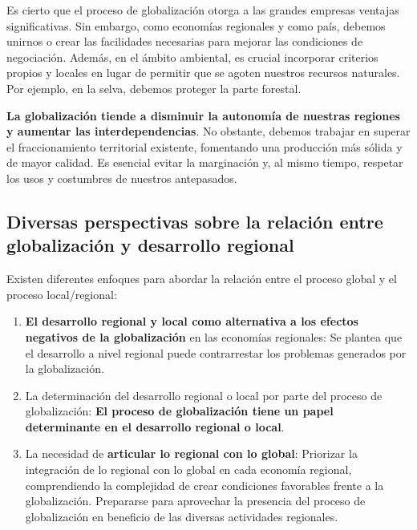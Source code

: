 \documentclass[
  letterpaper,
  DIV=11,
  numbers=noendperiod]{scrartcl}
\begin{document}
Es cierto que el proceso de globalización otorga a las grandes empresas
ventajas significativas. Sin embargo, como economías regionales y como
país, debemos unirnos o crear las facilidades necesarias para mejorar
las condiciones de negociación. Además, en el ámbito ambiental, es
crucial incorporar criterios propios y locales en lugar de permitir que
se agoten nuestros recursos naturales. Por ejemplo, en la selva, debemos
proteger la parte forestal.

\textbf{La globalización tiende a disminuir la autonomía de nuestras
regiones y aumentar las interdependencias}. No obstante, debemos
trabajar en superar el fraccionamiento territorial existente, fomentando
una producción más sólida y de mayor calidad. Es esencial evitar la
marginación y, al mismo tiempo, respetar los usos y costumbres de
nuestros antepasados.

\hypertarget{diversas-perspectivas-sobre-la-relaciuxf3n-entre-globalizaciuxf3n-y-desarrollo-regional}{%
\subsection{Diversas perspectivas sobre la relación entre globalización
y desarrollo
regional}\label{diversas-perspectivas-sobre-la-relaciuxf3n-entre-globalizaciuxf3n-y-desarrollo-regional}}

Existen diferentes enfoques para abordar la relación entre el proceso
global y el proceso local/regional:

\begin{enumerate}
\def\labelenumi{\arabic{enumi}.}
\item
  \textbf{El desarrollo regional y local como alternativa a los efectos
  negativos de la globalización} en las economías regionales: Se plantea
  que el desarrollo a nivel regional puede contrarrestar los problemas
  generados por la globalización.
\item
  La determinación del desarrollo regional o local por parte del proceso
  de globalización: \textbf{El proceso de globalización tiene un papel
  determinante en el desarrollo regional o local}.
\item
  La necesidad de \textbf{articular lo regional con lo global}:
  Priorizar la integración de lo regional con lo global en cada economía
  regional, comprendiendo la complejidad de crear condiciones favorables
  frente a la globalización. Prepararse para aprovechar la presencia del
  proceso de globalización en beneficio de las diversas actividades
  regionales.
\end{enumerate}
\end{document}
